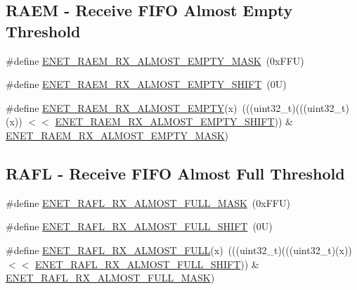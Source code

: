 \subsection*{R\+A\+EM -\/ Receive F\+I\+FO Almost Empty Threshold}
\begin{DoxyCompactItemize}
\item 
\#define \mbox{\hyperlink{group___e_n_e_t___register___masks_ga37982efb14bcd40ca10c696e7368dce2}{E\+N\+E\+T\+\_\+\+R\+A\+E\+M\+\_\+\+R\+X\+\_\+\+A\+L\+M\+O\+S\+T\+\_\+\+E\+M\+P\+T\+Y\+\_\+\+M\+A\+SK}}~(0x\+F\+F\+U)
\item 
\#define \mbox{\hyperlink{group___e_n_e_t___register___masks_gad89e89d3db86bdebd82cba2f2994e4df}{E\+N\+E\+T\+\_\+\+R\+A\+E\+M\+\_\+\+R\+X\+\_\+\+A\+L\+M\+O\+S\+T\+\_\+\+E\+M\+P\+T\+Y\+\_\+\+S\+H\+I\+FT}}~(0\+U)
\item 
\#define \mbox{\hyperlink{group___e_n_e_t___register___masks_gaf15ad096303b974696f055666297cf38}{E\+N\+E\+T\+\_\+\+R\+A\+E\+M\+\_\+\+R\+X\+\_\+\+A\+L\+M\+O\+S\+T\+\_\+\+E\+M\+P\+TY}}(x)~(((uint32\+\_\+t)(((uint32\+\_\+t)(x)) $<$$<$ \mbox{\hyperlink{group___e_n_e_t___register___masks_gad89e89d3db86bdebd82cba2f2994e4df}{E\+N\+E\+T\+\_\+\+R\+A\+E\+M\+\_\+\+R\+X\+\_\+\+A\+L\+M\+O\+S\+T\+\_\+\+E\+M\+P\+T\+Y\+\_\+\+S\+H\+I\+FT}})) \& \mbox{\hyperlink{group___e_n_e_t___register___masks_ga37982efb14bcd40ca10c696e7368dce2}{E\+N\+E\+T\+\_\+\+R\+A\+E\+M\+\_\+\+R\+X\+\_\+\+A\+L\+M\+O\+S\+T\+\_\+\+E\+M\+P\+T\+Y\+\_\+\+M\+A\+SK}})
\end{DoxyCompactItemize}
\subsection*{R\+A\+FL -\/ Receive F\+I\+FO Almost Full Threshold}
\begin{DoxyCompactItemize}
\item 
\#define \mbox{\hyperlink{group___e_n_e_t___register___masks_ga3b79bb95900a65117a1e64a98e0ca741}{E\+N\+E\+T\+\_\+\+R\+A\+F\+L\+\_\+\+R\+X\+\_\+\+A\+L\+M\+O\+S\+T\+\_\+\+F\+U\+L\+L\+\_\+\+M\+A\+SK}}~(0x\+F\+F\+U)
\item 
\#define \mbox{\hyperlink{group___e_n_e_t___register___masks_ga3b190ba30467b67b3d17589f3f193475}{E\+N\+E\+T\+\_\+\+R\+A\+F\+L\+\_\+\+R\+X\+\_\+\+A\+L\+M\+O\+S\+T\+\_\+\+F\+U\+L\+L\+\_\+\+S\+H\+I\+FT}}~(0\+U)
\item 
\#define \mbox{\hyperlink{group___e_n_e_t___register___masks_gab63ee8b6dcb24483573b2ef4d95c09e9}{E\+N\+E\+T\+\_\+\+R\+A\+F\+L\+\_\+\+R\+X\+\_\+\+A\+L\+M\+O\+S\+T\+\_\+\+F\+U\+LL}}(x)~(((uint32\+\_\+t)(((uint32\+\_\+t)(x)) $<$$<$ \mbox{\hyperlink{group___e_n_e_t___register___masks_ga3b190ba30467b67b3d17589f3f193475}{E\+N\+E\+T\+\_\+\+R\+A\+F\+L\+\_\+\+R\+X\+\_\+\+A\+L\+M\+O\+S\+T\+\_\+\+F\+U\+L\+L\+\_\+\+S\+H\+I\+FT}})) \& \mbox{\hyperlink{group___e_n_e_t___register___masks_ga3b79bb95900a65117a1e64a98e0ca741}{E\+N\+E\+T\+\_\+\+R\+A\+F\+L\+\_\+\+R\+X\+\_\+\+A\+L\+M\+O\+S\+T\+\_\+\+F\+U\+L\+L\+\_\+\+M\+A\+SK}})
\end{DoxyCompactItemize}
